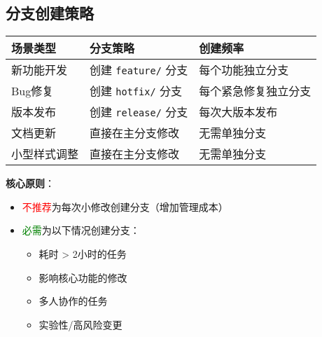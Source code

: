 \subsection{分支创建策略}
\begin{center}
\begin{tabular}{@{}lll@{}}
    \toprule
    \textbf{场景类型} & \textbf{分支策略} & \textbf{创建频率} \\
    \midrule
    新功能开发 & 创建 \texttt{feature/} 分支 & 每个功能独立分支 \\
    Bug修复 & 创建 \texttt{hotfix/} 分支 & 每个紧急修复独立分支 \\
    版本发布 & 创建 \texttt{release/} 分支 & 每次大版本发布 \\
    文档更新 & 直接在主分支修改 & 无需单独分支 \\
    小型样式调整 & 直接在主分支修改 & 无需单独分支 \\
    \bottomrule
\end{tabular}
\end{center}

\textbf{核心原则}：
\begin{itemize}[leftmargin=*, nosep]
    \item \textcolor{red}{不推荐}为每次小修改创建分支（增加管理成本）
    \item \textcolor{green}{必需}为以下情况创建分支：
    \begin{itemize}[leftmargin=*, nosep]
        \item 耗时 > 2小时的任务
        \item 影响核心功能的修改
        \item 多人协作的任务
        \item 实验性/高风险变更
    \end{itemize}
\end{itemize}

